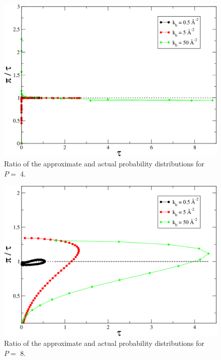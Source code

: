                 \begin{figure}[!htbp]
                    \centering
                    \includegraphics[scale=0.20,keepaspectratio]{Chapter-4/Figures/ratio2B.png}
                    \caption{Ratio of the approximate and actual probability distributions for $P =$ 4.}
                    \label{fig:ratio2B}
                \end{figure}

                \begin{figure}[!htbp]
                    \centering
                    \includegraphics[scale=0.20,keepaspectratio]{Chapter-4/Figures/ratio4B.png}
                    \caption{Ratio of the approximate and actual probability distributions for $P =$ 8.}
                    \label{fig:ratio4B}
                \end{figure}

